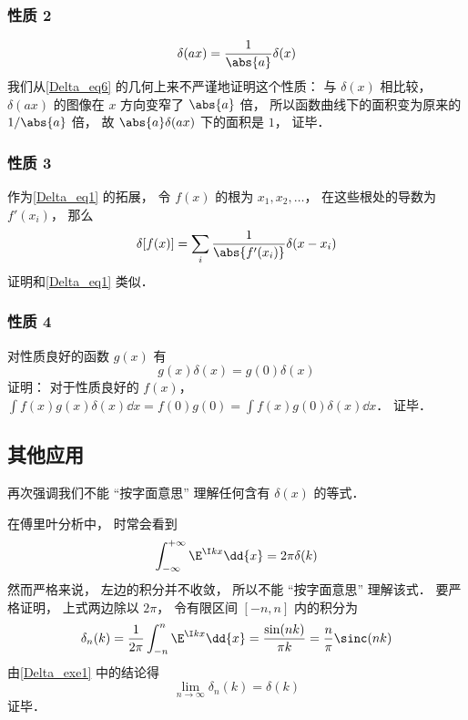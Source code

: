 \subsubsection{性质 2}
\begin{equation}\label{Delta_eq1}
\delta(ax) = \frac{1}{\abs{a}} \delta(x)
\end{equation}
我们从\autoref{Delta_eq6} 的几何上来不严谨地证明这个性质： 与 $\delta(x)$ 相比较， $\delta(ax)$ 的图像在 $x$ 方向变窄了 $\abs{a}$ 倍， 所以函数曲线下的面积变为原来的 $1/\abs{a}$ 倍， 故 $\abs{a}\delta(ax)$ 下的面积是 $1$， 证毕．

\subsubsection{性质 3}
作为\autoref{Delta_eq1} 的拓展， 令 $f(x)$ 的根为 $x_1, x_2, \dots$， 在这些根处的导数为 $f'(x_i)$， 那么
\begin{equation}
\delta[f(x)] = \sum_i \frac{1}{\abs{f'(x_i)}} \delta(x - x_i)
\end{equation}
证明和\autoref{Delta_eq1} 类似．

\subsubsection{性质 4}
对性质良好的函数 $g(x)$ 有
\begin{equation}
g(x)\delta(x) = g(0)\delta(x)
\end{equation}
证明： 对于性质良好的 $f(x)$， $\int f(x) g(x)\delta(x) \dd{x} = f(0)g(0) = \int f(x)g(0)\delta(x) \dd{x}$． 证毕．

\subsection{其他应用}
再次强调我们不能 “按字面意思” 理解任何含有 $\delta(x)$ 的等式．
\begin{example}{}\label{Delta_ex1}
在傅里叶分析中， 时常会看到
\begin{equation}\label{Delta_eq8}
\int_{-\infty}^{+\infty} \E^{\I kx}\dd{x} = 2\pi \delta(k)
\end{equation}
然而严格来说， 左边的积分并不收敛， 所以不能 “按字面意思” 理解该式． 要严格证明， 上式两边除以 $2\pi$， 令有限区间 $[-n,n]$ 内的积分为
\begin{equation}
\delta_n(k) = \frac{1}{2\pi}\int_{-n}^{n} \E^{\I kx}\dd{x} = \frac{\sin(n k)}{\pi k} = \frac{n}{\pi} \sinc(n k)
\end{equation}
由\autoref{Delta_exe1} 中的结论得
\begin{equation}
\lim_{n\to\infty} \delta_n(k) = \delta(k)
\end{equation}
证毕．
\end{example}

